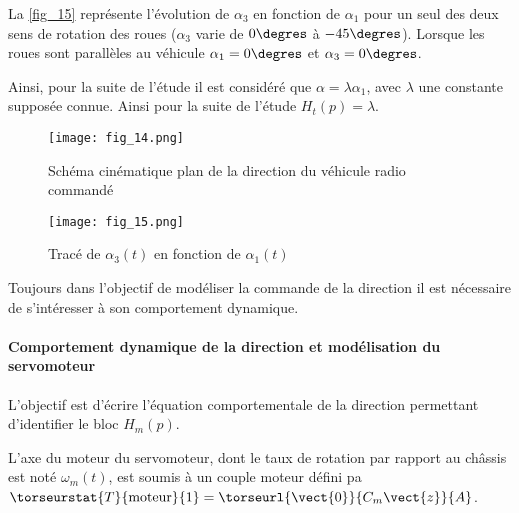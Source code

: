 
La \autoref{fig_15} représente l’évolution de $\alpha_3$  en fonction de $\alpha_1$ pour un seul des deux sens de rotation des roues ($\alpha_3$ varie de $0\degres$ à $-45\degres$). Lorsque les roues sont parallèles au véhicule $\alpha_1 = 0\degres$ et $\alpha_3 = 0\degres$.


Ainsi, pour la suite de l’étude il est considéré que $\alpha=\lambda\alpha_1$, avec $\lambda$ une constante supposée connue. Ainsi pour la suite de l’étude $H_t(p)=\lambda$.



\begin{figure}[H]
\centering
\texttt{[image: fig\_14.png]}
\caption{Schéma cinématique plan de la direction du véhicule radio commandé \label{fig_14}}
\end{figure}


\begin{figure}[H]
\centering
\texttt{[image: fig\_15.png]}
\caption{Tracé de $\alpha_3(t)$ en fonction de $\alpha_1(t)$ \label{fig_15}}
\end{figure}

Toujours dans l’objectif de modéliser la commande de la direction il est nécessaire de s’intéresser à son comportement dynamique.

\paragraph{Comportement dynamique de la direction et modélisation du servomoteur}

\begin{obj}
L’objectif est d’écrire l’équation comportementale de la direction permettant d’identifier le bloc $H_m(p)$.
\end{obj}

L’axe du moteur du servomoteur, dont le taux de rotation par rapport au châssis est noté $\omega_m(t)$, est soumis à un couple moteur défini pa
$\torseurstat{T}{\text{moteur}}{1} =\torseurl{\vect{0}}{C_m\vect{z}}{A}$. 

